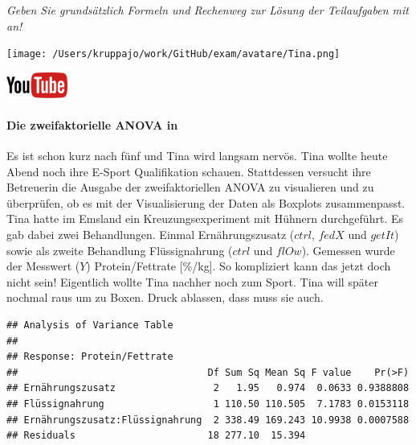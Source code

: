 \documentclass[a4paper, 9pt]{scrartcl}\usepackage[]{graphicx}\usepackage[]{xcolor}
\makeatletter
\newenvironment{kframe}{%
 \def\at@end@of@kframe{}%
 \ifinner\ifhmode%
  \def\at@end@of@kframe{\end{minipage}}%
  \begin{minipage}{\columnwidth}%
 \fi\fi%
 \def\FrameCommand##1{\hskip\@totalleftmargin \hskip-\fboxsep
 \colorbox{shadecolor}{##1}\hskip-\fboxsep
     \hskip-\linewidth \hskip-\@totalleftmargin \hskip\columnwidth}%
 \MakeFramed {\advance\hsize-\width
   \@totalleftmargin\z@ \linewidth\hsize
   \@setminipage}}%
 {\par\unskip\endMakeFramed%
 \at@end@of@kframe}
\newenvironment{knitrout}{}{} %
\makeatother
\begin{document}
\textit{Geben Sie grundsätzlich Formeln und Rechenweg zur Lösung der Teilaufgaben mit an!} \\[1Ex]
 

 
\begin{minipage}[t]{0.5\textwidth}
\texttt{[image: /Users/kruppajo/work/GitHub/exam/avatare/Tina.png]}
\end{minipage}
\begin{minipage}[t]{0.5\textwidth}
\hfill
\href{https://youtu.be/rWTyHXXlYjY}{\includegraphics[width = 2cm]{img/youtube}}
\end{minipage}
\vspace{-3Ex}



\paragraph{Die zweifaktorielle ANOVA in \Rlogo}

Es ist schon kurz nach fünf und Tina wird langsam nervös. Tina wollte heute Abend noch ihre E-Sport Qualifikation schauen. Stattdessen versucht ihre Betreuerin die Ausgabe der zweifaktoriellen ANOVA zu visualieren und zu überprüfen, ob es mit der Visualisierung der Daten als Boxplots zusammenpasst. Tina hatte im Emsland ein Kreuzungsexperiment mit Hühnern durchgeführt. Es gab dabei zwei Behandlungen. Einmal Ernährungszusatz ($ctrl$, $fedX$ und $getIt$) sowie als zweite Behandlung Flüssignahrung ($ctrl$ und $flOw$). Gemessen wurde der Messwert ($Y$) Protein/Fettrate [\%/kg]. So kompliziert kann das jetzt doch nicht sein! Eigentlich wollte Tina nachher noch zum Sport. Tina will später nochmal raus um zu Boxen. Druck ablassen, dass muss sie auch.

\begin{knitrout}
\color{fgcolor}\begin{kframe}
\begin{verbatim}
## Analysis of Variance Table
## 
## Response: Protein/Fettrate
##                                 Df Sum Sq Mean Sq F value    Pr(>F)
## Ernährungszusatz                 2   1.95   0.974  0.0633 0.9388808
## Flüssignahrung                   1 110.50 110.505  7.1783 0.0153118
## Ernährungszusatz:Flüssignahrung  2 338.49 169.243 10.9938 0.0007588
## Residuals                       18 277.10  15.394
\end{verbatim}
\end{kframe}
\end{knitrout}
\end{document}
